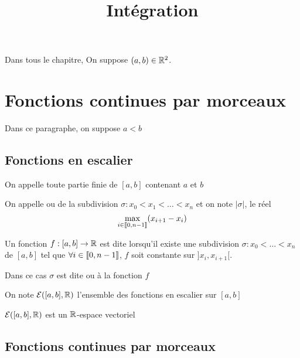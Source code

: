 

\title{Intégration}



\maketitle
\pagebreak
\tableofcontents
\pagebreak

Dans tous le chapitre, On suppose $(a, b) \in \mathbb{R}^2$.

\section{Fonctions continues par morceaux}

Dans ce paragraphe, on suppose $a < b$

\subsection{Fonctions en escalier}

\begin{dfn}
On appelle  toute partie finie
de $[a, b]$ contenant $a$ et $b$
\end{dfn}

\begin{dfn}
On appelle  ou  de la subdivision
$\sigma : x_0 < x_1 < \ldots < x_n$ et on note $|\sigma|$, le réel
\[
    \max_{i \in \llbracket 0, n - 1 \rrbracket} (x_{i + 1} - x_i)
\]
\end{dfn}

\begin{dfn}
Un fonction $f : [a, b] \to \mathbb{R}$ est dite  lorsqu'il existe une subdivision $\sigma : x_0 < \ldots < x_n$
de $[a, b]$ tel que $\forall i \in \llbracket 0, n- 1 \rrbracket$, $f$ soit
constante sur $]x_i, x_{i + 1}[$.

Dans ce cas $\sigma$ est dite  ou  à la
fonction $f$
\end{dfn}

\begin{dfn}
On note $\mathcal{E}([a, b], \mathbb{R})$ l'ensemble des fonctions en escalier
sur $[a, b]$
\end{dfn}

\begin{dfn}
$\mathcal{E}([a, b], \mathbb{R})$ est un $\mathbb{R}$-espace vectoriel
\end{dfn}

\subsection{Fonctions continues par morceaux}

